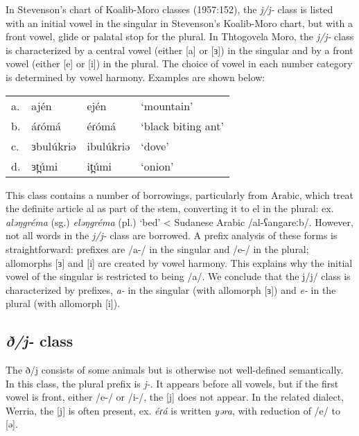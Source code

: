 In Stevenson’s chart of Koalib-Moro classes (1957:152), the \textit{j/j-} class is listed with an initial vowel in the singular in Stevenson’s Koalib-Moro chart, but with a front vowel, glide or palatal stop for the plural. In Thtogovela Moro, the \textit{j/j-} class is characterized by a central vowel (either [a] or [ɜ]) in the singular and by a front vowel (either [e] or [i]) in the plural. The choice of vowel in each number category is determined by vowel harmony. Examples are shown below:

\ea	
\begin{tabular}[t]{llll}
a.	&	ajén		&	ején		&	‘mountain’\\
b.	&	áɾómá		&	éɾómá	&	‘black biting ant’\\
c.	&	ɜbulúkriə	&	ibulúkriə&	‘dove’\\
d.	&	ɜt̪úmi		&	it̪úmi	&	‘onion’	\\
\end{tabular}
\z

This class contains a number of borrowings, particularly from Arabic, which treat the definite article al as part of the stem, converting it to el in the plural: ex. \textit{aləŋgréma} (sg.) \textit{eləŋgréma} (pl.) ‘bed’ < Sudanese Arabic /al-ʕangareːb/. However, not all words in the \textit{j/j-} class are borrowed. A prefix analysis of these forms is straightforward: prefixes are /a-/ in the singular and /e-/ in the plural; allomorphs [ɜ] and [i] are created by vowel harmony. This explains why the initial vowel of the singular is restricted to being /a/. We conclude that the j/j/ class is characterized by prefixes, \textit{a-} in the singular (with allomorph [ɜ]) and \textit{e-} in the plural (with allomorph [i]). 


\subsection{\textit{ð/j-} class}

The ð/j consists of some animals but is otherwise not well-defined semantically. In this class, the plural prefix is \textit{j-}. It appears before all vowels, but if the first vowel is front, either /e-/ or /i-/, the [j] does not appear.  In the related dialect, Werria, the [j] is often present, ex. \textit{éɾá} is written \textit{yəra}, with reduction of /e/ to [ə]. 

